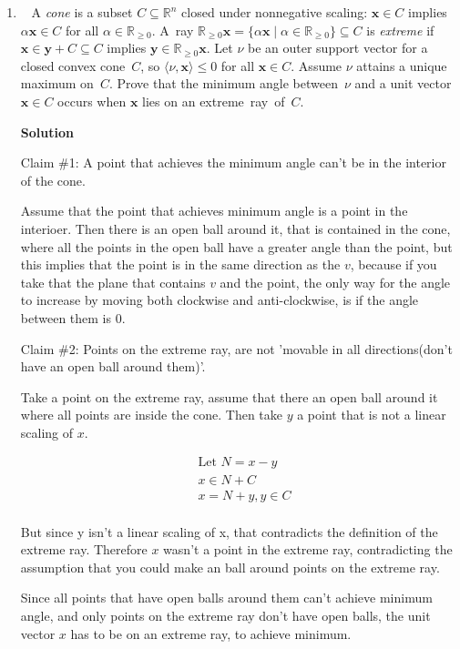 \documentclass[11pt]{article}
\newcommand\score[1]{\marginpar{\vspace{-2ex}\color{blue}{#1/3}}\hspace{-1ex}}
\newcommand\0{\mathbf{0}}
\newcommand\RR{\mathbb{R}}
\newcommand\xx{\mathbf{x}}
\newcommand\yy{\mathbf{y}}
\newcommand\<{\langle}
\renewcommand\>{\rangle}
\begin{document}
\begin{enumerate}
\pagebreak

\item\ \score{}%
A \emph{cone} is a subset $C \subseteq \RR^n$ closed under nonnegative
scaling: $\xx \in C$ implies $\alpha \xx \in C$ for all $\alpha \in
\RR_{\geq 0}$.  A~ray $\RR_{\geq 0}\xx = \{\alpha\xx \mid \alpha \in
\RR_{\geq 0}\} \subseteq C$ is \emph{extreme} if $\xx \in \yy + C
\subseteq C$ implies $\yy \in \RR_{\geq 0}\xx$.  Let $\nu$ be an outer
support vector for a closed convex cone~$C$, so $\<\nu,\xx\> \leq 0$
for all $\xx \in C$.  Assume $\nu$ attains a unique maximum on~$C$.
Prove that the minimum angle between~$\nu$ and a unit vector~$\xx \in
C$ occurs when $\xx$ lies on an extreme~ray~of~$C$.

\textbf{Solution}

Claim \#1: A point that achieves the minimum angle can't be in the interior of the cone.

Assume that the point that achieves minimum angle is a point in the interioer.
Then there is an open ball around it, that is contained in the cone, where all the points in the 
open ball have a greater angle than the point, but this implies that the point is 
in the same direction as the $v$, because if you take that the plane that contains $v$ and the point,
the only way for the angle to increase by moving both clockwise and anti-clockwise, is if the angle between
them is 0.

Claim \#2: Points on the extreme ray, are not 'movable in all directions(don't have an open ball around them)'.

Take a point on the extreme ray, assume that there an open ball around it where all points are inside
the cone. Then take $y$ a point that is not a linear scaling of $x$.

\begin{align*}
  &\text{Let } N=x-y\\
  &x \in N + C\\
  &x = N + y, y \in C\\
\end{align*}

But since y isn't a linear scaling of x, that contradicts the definition of the extreme ray.
Therefore $x$ wasn't a point in the extreme ray, contradicting the assumption that you 
could make an ball around points on the extreme ray.


Since all points that have open balls around them can't achieve minimum angle, and only points on
the extreme ray don't have open balls, the unit vector $x$ has to be on an extreme ray, to achieve
minimum.


\end{enumerate}
\end{document}
